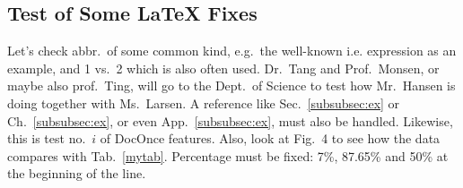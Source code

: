 \documentclass[%
oneside,                 %
final,                   %
10pt]{article}
\theoremstyle{definition}
\begin{document}
\begin{enumerate}
\subsection{Test of Some {\LaTeX} Fixes}
Let's check abbr.~of some common kind, e.g.~the well-known i.e.
expression as an example, and 1 vs.~2 which is also often used.
Dr.~Tang and Prof.~Monsen, or maybe also prof.~Ting,
will go to the Dept.~of Science to test how Mr.~Hansen is doing together
with Ms.~Larsen. A reference like Sec.~\vref{subsubsec:ex} or
Ch.~\vref{subsubsec:ex}, or even App.~\vref{subsubsec:ex}, must also be
handled. Likewise, this is test no.~$i$ of DocOnce features.
Also, look at Fig.~4 to see how the data compares with Tab.~\vref{mytab}.
Percentage must be fixed: 7\%,  87.65\% and
50\% at the beginning of the line.

\end{enumerate}
\end{document}
